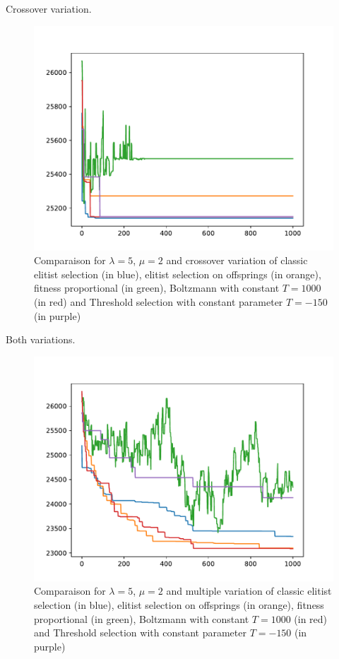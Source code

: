 \documentclass{beamer}
\begin{document}
\begin{frame}
	Crossover variation.
\begin{figure}
\centering
\includegraphics[scale=.5]{../Plots/new/5,2,crossover,eofb1000t-150.pdf}
\caption{Comparaison for $\lambda = 5$, $\mu = 2$ and crossover variation of
classic elitist selection (in blue), elitist selection on offsprings (in
orange), fitness proportional (in green), Boltzmann with constant $T = 1000$
(in red) and Threshold selection with constant parameter $T = -150$ (in
purple)}
\label{Crossovercompareselection}
\end{figure}
\end{frame}

\begin{frame}
	Both variations.
\begin{figure}
\centering
\includegraphics[scale=.5]{../Plots/new/5,2,multiple,eofb1000t-150.pdf}
\caption{Comparaison for $\lambda = 5$, $\mu = 2$ and multiple variation of
classic elitist selection (in blue), elitist selection on offsprings (in
orange), fitness proportional (in green), Boltzmann with constant $T = 1000$
(in red) and Threshold selection with constant parameter $T = -150$ (in
purple)}
\label{Multiplecompareselection}
\end{figure}
\end{frame}
\end{document}
